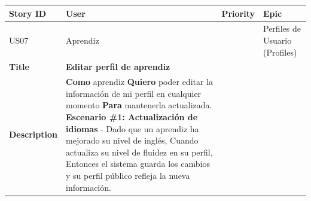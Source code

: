 {\def\LTcaptype{none} %
\begin{longtable}[]{@{}
  >{\raggedright\arraybackslash}p{}
  >{\raggedright\arraybackslash}p{}
  >{\raggedright\arraybackslash}p{}
  >{\raggedright\arraybackslash}p{}@{}}
\toprule\noalign{}
\begin{minipage}[b]{\linewidth}\raggedright
Story ID
\end{minipage} & \begin{minipage}[b]{\linewidth}\raggedright
User
\end{minipage} & \begin{minipage}[b]{\linewidth}\raggedright
Priority
\end{minipage} & \begin{minipage}[b]{\linewidth}\raggedright
Epic
\end{minipage} \\
\midrule\noalign{}
\endhead
\bottomrule\noalign{}
\endlastfoot
US07 & Aprendiz & 2 & Perfiles de Usuario (Profiles) \\
\textbf{Title} & \textbf{Editar perfil de aprendiz} & & \\
\textbf{Description} & \textbf{Como} aprendiz \textbf{Quiero} poder
editar la información de mi perfil en cualquier momento \textbf{Para}
mantenerla actualizada. \textbf{Escenario \#1: Actualización de idiomas}
- Dado que un aprendiz ha mejorado su nivel de inglés, Cuando actualiza
su nivel de fluidez en su perfil, Entonces el sistema guarda los cambios
y su perfil público refleja la nueva información. & & \\
\end{longtable}
}

